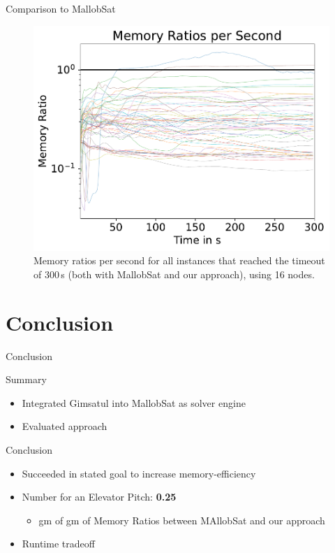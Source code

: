 \documentclass{beamer}
\begin{document}
\begin{frame}{Comparison to MallobSat}
    \center
    \begin{figure}[c]{}
      \center
      \includegraphics[scale=.45]{plots/16node_compare/mem_ratio_per_second.pdf}
      \caption{Memory ratios per second for all instances that reached the timeout of $300\,$s (both with MallobSat and our approach), using 16 nodes.} %
    \end{figure}
\end{frame}


\section{Conclusion}
\begin{frame}{Conclusion}
    \begin{block}{Summary}
        \begin{itemize}
            \item Integrated Gimsatul into MallobSat as solver engine
            \item Evaluated approach
        \end{itemize}
    \end{block}

    \begin{block}{Conclusion}
        \begin{itemize}
            \item Succeeded in stated goal to increase memory-efficiency
            \item Number for an Elevator Pitch: \textbf{0.25}
            \begin{itemize}
                \item gm of gm of Memory Ratios between MAllobSat and our approach
            \end{itemize}
            \item Runtime tradeoff
        \end{itemize}
    \end{block}
\end{frame}
\end{document}
